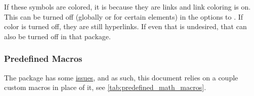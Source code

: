 If these symbols are colored, it is because they are links and link coloring is on.
This can be turned off (globally or for certain elements) in the options to
.
If color is turned off, they are still hyperlinks.
If even that is undesired, that can also be turned off in that package.

\subsubsection{Predefined Macros}

The  package has some
\href{https://tex.stackexchange.com/q/471532/120853}{issues},
and as such, this document relies on a couple custom macros in place of it, see
\cref{tab:predefined_math_macros}.

\begin{table}[tbp]


\end{table}
